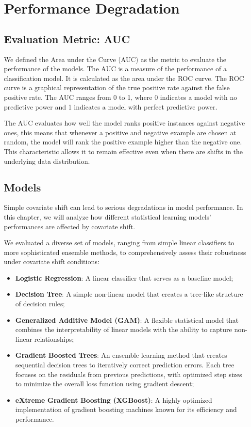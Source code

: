 \chapter{Performance Degradation}

\section{Evaluation Metric: AUC}

We defined the Area under the Curve (AUC) as the metric to evaluate the performance of the models. The AUC is a measure of the performance of a classification model.
It is calculated as the area under the ROC curve. The ROC curve is a graphical representation of the true positive rate against the false positive rate. The AUC ranges from 0 to 1, where 0 indicates a model with no predictive power and 1 indicates a model with perfect predictive power. 

The AUC evaluates how well the model ranks positive instances against negative ones, this means that whenever a positive and negative example are chosen at random, the model will rank the positive example higher than the negative one. This characteristic allows it to remain effective even when there are shifts in the underlying data distribution.

\section{Models}

Simple covariate shift can lead to serious degradations in model performance. In this chapter, we will analyze how different statistical learning models' performances are affected by covariate shift. 

We evaluated a diverse set of models, ranging from simple linear classifiers to more sophisticated ensemble methods, to comprehensively assess their robustness under covariate shift conditions:

\begin{itemize}
    \item \textbf{Logistic Regression}: A linear classifier that serves as a baseline model;
    \item \textbf{Decision Tree}: A simple non-linear model that creates a tree-like structure of decision rules;
    \item \textbf{Generalized Additive Model (GAM)}: A flexible statistical model that combines the interpretability of linear models with the ability to capture non-linear relationships;
    \item \textbf{Gradient Boosted Trees}: An ensemble learning method that creates sequential decision trees to iteratively correct prediction errors. Each tree focuses on the residuals from previous predictions, with optimized step sizes to minimize the overall loss function using gradient descent;
    \item \textbf{eXtreme Gradient Boosting (XGBoost)}: A highly optimized implementation of gradient boosting machines known for its efficiency and performance.
\end{itemize}

